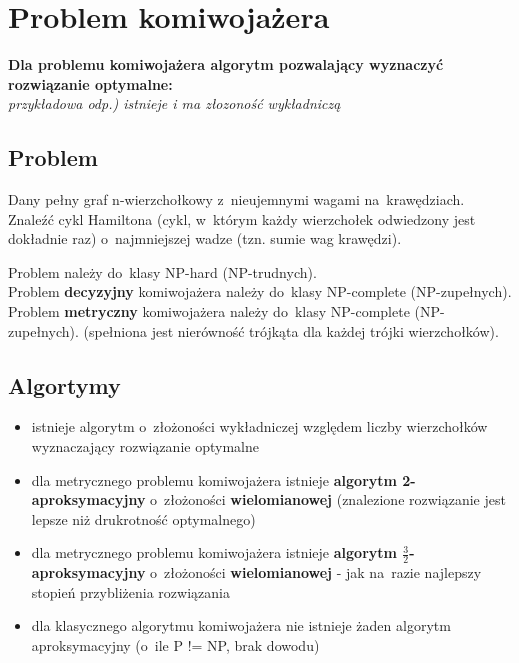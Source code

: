 \section{Problem komiwojażera}

\textbf{Dla problemu komiwojażera algorytm pozwalający wyznaczyć rozwiązanie optymalne:}\\
\textit{przykładowa odp.) istnieje i ma złozoność wykładniczą}

\vspace{0.4cm}


\subsection{Problem}
Dany pełny graf n-wierzchołkowy z~nieujemnymi wagami na~krawędziach. Znaleźć cykl Hamiltona (cykl, w~którym każdy wierzchołek odwiedzony jest dokładnie raz) o~najmniejszej wadze (tzn. sumie wag krawędzi).

\noindent Problem należy do~klasy NP-hard (NP-trudnych).\\
Problem \textbf{decyzyjny} komiwojażera należy do~klasy NP-complete (NP-zupełnych).\\
Problem \textbf{metryczny} komiwojażera należy do~klasy NP-complete (NP-zupełnych). (spełniona jest nierówność trójkąta dla każdej trójki wierzchołków).\\

\subsection{Algortymy}
\begin{itemize}
	\item istnieje algorytm o~złożoności wykładniczej względem liczby wierzchołków wyznaczający rozwiązanie optymalne
	\item dla metrycznego problemu komiwojażera istnieje \textbf{algorytm 2-aproksymacyjny} o~złożoności \textbf{wielomianowej} (znalezione rozwiązanie jest lepsze niż drukrotność optymalnego)
	\item dla metrycznego problemu komiwojażera istnieje \textbf{algorytm $\frac{3}{2}$-aproksymacyjny} o~złożoności \textbf{wielomianowej} - jak na~razie najlepszy stopień przybliżenia rozwiązania
	\item dla klasycznego algorytmu komiwojażera nie istnieje żaden algorytm aproksymacyjny (o~ile P != NP, brak dowodu)
\end{itemize}

